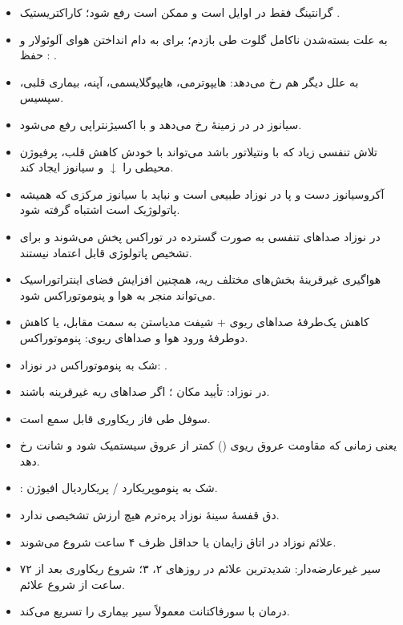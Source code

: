 \documentclass[12pt,a4paper]{article}
\begin{document}
\begin{itemize}
\item گرانتینگ فقط در اوایل است و ممکن است رفع شود؛ کاراکتریستیک .
\item به علت بسته‌شدن ناکامل گلوت طی بازدم؛ برای به دام انداختن هوای آلوئولار و حفظ : .
\item به علل دیگر هم رخ می‌دهد: هایپوترمی، هایپوگلایسمی، آپنه، بیماری قلبی، سپسیس.
\item سیانوز در  در زمینهٔ  رخ می‌دهد و با اکسیژنتراپی رفع می‌شود.
\item تلاش تنفسی زیاد که با ونتیلاتور  باشد می‌تواند با خودش کاهش  قلب، پرفیوژن محیطی را $\downarrow$ و سیانوز ایجاد کند.
\item آکروسیانوز دست و پا در نوزاد طبیعی است و نباید با سیانوز مرکزی که همیشه پاتولوژیک است اشتباه گرفته شود.
\item در نوزاد صداهای تنفسی به صورت گسترده در توراکس پخش می‌شوند و برای تشخیص پاتولوژی قابل اعتماد نیستند.
\item هواگیری غیرقرینهٔ بخش‌های مختلف ریه، همچنین افزایش  فضای اینتراتوراسیک می‌تواند منجر به  هوا و پنوموتوراکس شود.
\item کاهش یک‌طرفهٔ صداهای ریوی + شیفت مدیاستن به سمت مقابل، یا کاهش دوطرفهٔ ورود هوا و صداهای ریوی: پنوموتوراکس.
\item شک به پنوموتوراکس در نوزاد: .
\item {} در نوزاد: تأیید مکان ؛ اگر صداهای ریه غیرقرینه باشند.
\end{itemize}

\begin{itemize}
\item سوفل  طی فاز ریکاوری  قابل سمع است.
\item یعنی زمانی که مقاومت عروق ریوی () کمتر از عروق سیستمیک شود و شانت  رخ دهد.
\item {}: شک به پنوموپریکارد / پریکاردیال افیوژن.
\item دق قفسهٔ سینهٔ نوزاد پره‌ترم هیچ ارزش تشخیصی ندارد.
\item علائم نوزاد در اتاق زایمان یا حداقل ظرف ۴ ساعت شروع می‌شوند.
\item سیر  غیرعارضه‌دار: شدیدترین علائم در روزهای ۲، ۳؛ شروع ریکاوری بعد از ۷۲ ساعت از شروع علائم.
\item درمان با سورفاکتانت معمولاً سیر بیماری را تسریع می‌کند.
\end{itemize}
\end{document}
